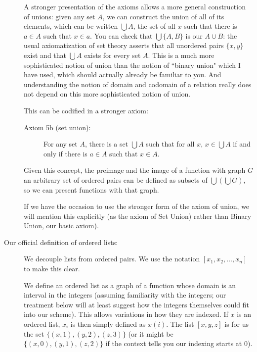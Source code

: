 \documentclass[12pt]{article}
\begin{document}
\begin{description}
A stronger presentation of the axioms allows a more general construction of unions:  given any set $A$, we can construct the union of all of its elements, which can be written $\bigcup A$, the set of all $x$ such that there is $a \in A$ such
that $x \in a$.  You can check that $\bigcup \{A,B\}$ is our $A \cup B$:  the usual axiomatization of set theory 
asserts that all unordered pairs $\{x,y\}$ exist and that $\bigcup A$ exists for every set $A$.  This is a much more sophisticated notion of union than the notion of ``binary union" which I have used, which should actually already be familiar to you.  And understanding the notion of domain and codomain of a relation really does not depend on this more sophisticated notion of union.

This can be codified in a stronger axiom:

\begin{description}

\item[Axiom 5b (set union):]  For any set $A$, there is a set $\bigcup A$ such that for all $x$, $x \in \bigcup A$ if and only if there is $a \in A$ such that $x \in A$.

\end{description}

Given this concept, the preimage and the image of a function with graph $G$ an arbitrary set of ordered pairs can be defined as subsets of $\bigcup(\bigcup G)$, so we can present functions with that graph.  



If we have the occasion to use the stronger form of the axiom of union, we will mention this explicitly (as the axiom of Set Union) rather than Binary Union, our basic axiom).



\item[Our official definition of ordered lists:]  We decouple lists from ordered pairs.  We use the notation
$[x_1,x_2,\ldots,x_n]$ to make this clear.

We define an ordered list as a graph of a function whose domain is an interval in the integers (assuming familiarity with the integers;  our treatment below will at least suggest how the integers themselves could fit into our scheme).  This allows variations in how
they are indexed.  If $x$ is an ordered list, $x_i$ is then simply defined as $x(i)$.  The list $[x,y,z]$ is for us
the set $\{(x,1),(y,2),(z,3)\}$ (or it might be $\{(x,0),(y,1),(z,2)\}$ if the context tells you our indexing starts at 0).


\end{description}
\end{document}
